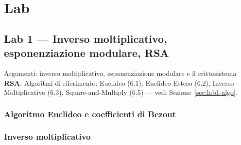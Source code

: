 % 
\chapter{Lab}

\section{Lab 1 — Inverso moltiplicativo, esponenziazione modulare, RSA}
Argomenti: inverso moltiplicativo, esponenziazione modulare e il crittosistema \textbf{RSA}.
Algoritmi di riferimento: Euclideo (6.1), Euclideo Esteso (6.2), Inverso Moltiplicativo (6.3), Square-and-Multiply (6.5) --- vedi Sezione~\ref{sec:lab1-algo}.

\subsection{Algoritmo Euclideo e coefficienti di Bezout}

\subsection{Inverso moltiplicativo}

